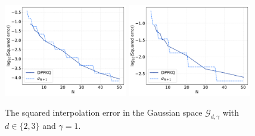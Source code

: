 \documentclass[twoside,11pt]{book}
\numberwithin{theorem}{chapter}
\numberwithin{definition}{chapter}
\numberwithin{proposition}{chapter}
\numberwithin{corollary}{chapter}
\numberwithin{example}{chapter}
\numberwithin{lemma}{chapter}
\numberwithin{assumption}{chapter}
\numberwithin{equation}{chapter}
\numberwithin{figure}{chapter}
\begin{document}
\begin{figure}[]
    \centering
\includegraphics[width= 0.48\textwidth]{img/neurips/multiHermite/Gaussian_2D_kernel_scale_1_fig_L.pdf}
\includegraphics[width= 0.48\textwidth]{img/neurips/multiHermite/Gaussian_3D_kernel_scale_1_fig_L.pdf} \\
\caption{The squared interpolation error in the Gaussian space $\mathcal{G}_{d,\gamma}$ with $d \in \{2,3\}$ and $\gamma=1$. \label{fig:GaussianResult}}
\end{figure}





\end{document}

